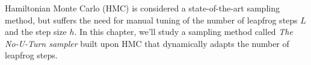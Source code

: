 Hamiltonian Monte Carlo (HMC) is considered a state-of-the-art sampling method, 
but suffers the need for manual tuning of the number of leapfrog steps $L$
and the step size $h$. In this chapter, we'll study a sampling method called \textit{The No-U-Turn sampler} \cite{} built upon
HMC that dynamically adapts the number of leapfrog steps. 

